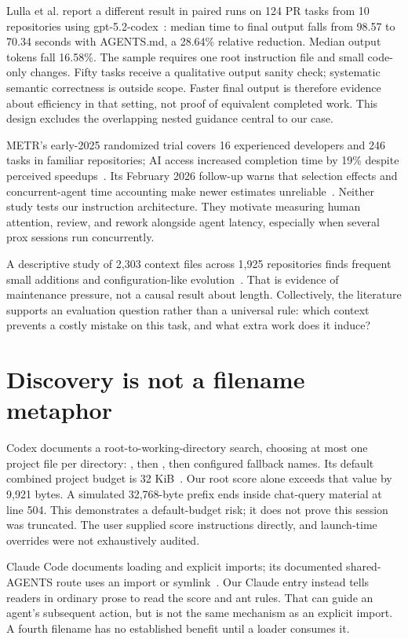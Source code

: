 \documentclass[10pt,letterpaper,twocolumn]{article}
\newcommand{\file}[1]{\texttt{\path{#1}}}
\begin{document}
Lulla et al. report a different result in paired runs on 124 PR tasks from 10 repositories using gpt-5.2-codex~\cite{lulla}: median time to final output falls from 98.57 to 70.34 seconds with AGENTS.md, a 28.64\% relative reduction. Median output tokens fall 16.58\%. The sample requires one root instruction file and small code-only changes. Fifty tasks receive a qualitative output sanity check; systematic semantic correctness is outside scope. Faster final output is therefore evidence about efficiency in that setting, not proof of equivalent completed work. This design excludes the overlapping nested guidance central to our case.

METR's early-2025 randomized trial covers 16 experienced developers and 246 tasks in familiar repositories; AI access increased completion time by 19\% despite perceived speedups~\cite{metr}. Its February 2026 follow-up warns that selection effects and concurrent-agent time accounting make newer estimates unreliable~\cite{metrupdate}. Neither study tests our instruction architecture. They motivate measuring human attention, review, and rework alongside agent latency, especially when several prox sessions run concurrently.

A descriptive study of 2,303 context files across 1,925 repositories finds frequent small additions and configuration-like evolution~\cite{readmes}. That is evidence of maintenance pressure, not a causal result about length. Collectively, the literature supports an evaluation question rather than a universal rule: which context prevents a costly mistake on this task, and what extra work does it induce?

\section{Discovery is not a filename metaphor}
Codex documents a root-to-working-directory search, choosing at most one project file per directory: \file{AGENTS.override.md}, then \file{AGENTS.md}, then configured fallback names. Its default combined project budget is 32 KiB~\cite{codex}. Our root score alone exceeds that value by 9,921 bytes. A simulated 32,768-byte prefix ends inside chat-query material at line 504. This demonstrates a default-budget risk; it does not prove this session was truncated. The user supplied score instructions directly, and launch-time overrides were not exhaustively audited.

Claude Code documents \file{CLAUDE.md} loading and explicit \file{@path} imports; its documented shared-AGENTS route uses an import or symlink~\cite{claude}. Our Claude entry instead tells readers in ordinary prose to read the score and ant rules. That can guide an agent's subsequent action, but is not the same mechanism as an explicit import. A fourth filename has no established benefit until a loader consumes it.
\end{document}

